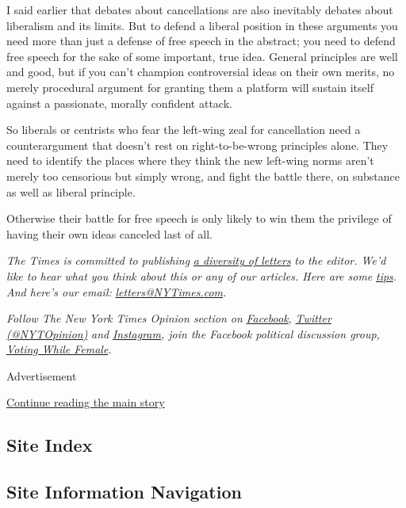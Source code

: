 I said earlier that debates about cancellations are also inevitably
debates about liberalism and its limits. But to defend a liberal
position in these arguments you need more than just a defense of free
speech in the abstract; you need to defend free speech for the sake of
some important, true idea. General principles are well and good, but if
you can't champion controversial ideas on their own merits, no merely
procedural argument for granting them a platform will sustain itself
against a passionate, morally confident attack.

So liberals or centrists who fear the left-wing zeal for cancellation
need a counterargument that doesn't rest on right-to-be-wrong principles
alone. They need to identify the places where they think the new
left-wing norms aren't merely too censorious but simply wrong, and fight
the battle there, on substance as well as liberal principle.

Otherwise their battle for free speech is only likely to win them the
privilege of having their own ideas canceled last of all.

\emph{The Times is committed to publishing}
\href{https://www.nytimes3xbfgragh.onion/2019/01/31/opinion/letters/letters-to-editor-new-york-times-women.html}{\emph{a
diversity of letters}} \emph{to the editor. We'd like to hear what you
think about this or any of our articles. Here are some}
\href{https://help.nytimes3xbfgragh.onion/hc/en-us/articles/115014925288-How-to-submit-a-letter-to-the-editor}{\emph{tips}}\emph{.
And here's our email:}
\href{mailto:letters@NYTimes.com}{\emph{letters@NYTimes.com}}\emph{.}

\emph{Follow The New York Times Opinion section on}
\href{https://www.facebookcorewwwi.onion/nytopinion}{\emph{Facebook}}\emph{,}
\href{http://twitter.com/NYTOpinion}{\emph{Twitter (@NYTOpinion)}}
\emph{and}
\href{https://www.instagram.com/nytopinion/}{\emph{Instagram}}\emph{,
join the Facebook political discussion group,}
\href{https://www.facebookcorewwwi.onion/groups/votingwhilefemale/}{\emph{Voting
While Female}}\emph{.}

Advertisement

\protect\hyperlink{after-bottom}{Continue reading the main story}

\hypertarget{site-index}{%
\subsection{Site Index}\label{site-index}}

\hypertarget{site-information-navigation}{%
\subsection{Site Information
Navigation}\label{site-information-navigation}}

